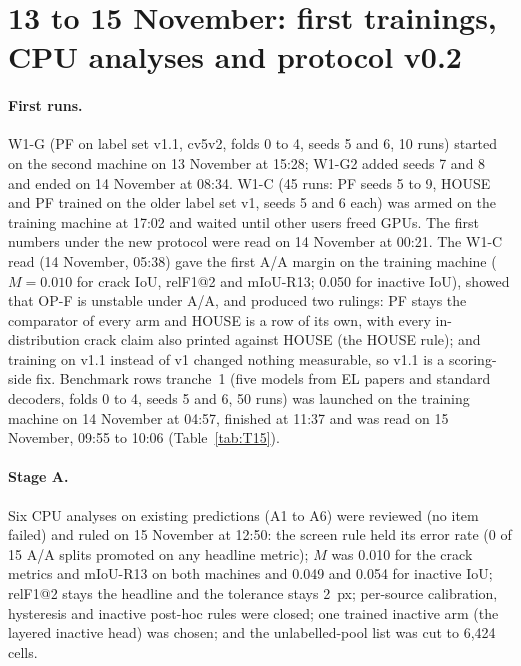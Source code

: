 \section{13 to 15 November: first trainings, CPU analyses and protocol v0.2}\label{sec:build-13nov}

\paragraph{First runs.} W1-G (PF on label set v1.1, cv5v2, folds 0 to 4, seeds 5 and 6, 10 runs) started on the second machine on
13 November at 15:28; W1-G2 added seeds 7 and 8 and ended on 14 November at 08:34. W1-C (45 runs: PF seeds 5 to 9, HOUSE and PF
trained on the older label set v1, seeds 5 and 6 each) was armed on the training machine at 17:02 and waited until other users freed
GPUs. The first numbers under the new protocol were read on 14 November at 00:21. The W1-C read (14 November, 05:38) gave the
first A/A margin on the training machine ($M=0.010$ for crack IoU, relF1@2 and mIoU-R13; 0.050 for inactive IoU), showed that OP-F
is unstable under A/A, and produced two rulings: PF stays the comparator of every arm and HOUSE is a row of its own, with every
in-distribution crack claim also printed against HOUSE (the HOUSE rule); and training on v1.1 instead of v1 changed nothing
measurable, so v1.1 is a scoring-side fix. Benchmark rows tranche~1 (five models from EL papers and standard decoders, folds 0 to 4,
seeds 5 and 6, 50 runs) was launched on the training machine on 14 November at 04:57, finished at 11:37 and was read on 15
November, 09:55 to 10:06 (Table~\ref{tab:T15}).

\paragraph{Stage A.} Six CPU analyses on existing predictions (A1 to A6) were reviewed (no item failed) and ruled on 15 November
at 12:50: the screen rule held its error rate (0 of 15 A/A splits promoted on any headline metric); $M$ was 0.010 for the crack
metrics and mIoU-R13 on both machines and 0.049 and 0.054 for inactive IoU; relF1@2 stays the headline and the tolerance stays
2~px; per-source calibration, hysteresis and inactive post-hoc rules were closed; one trained inactive arm (the layered inactive
head) was chosen; and the unlabelled-pool list was cut to 6,424 cells.


